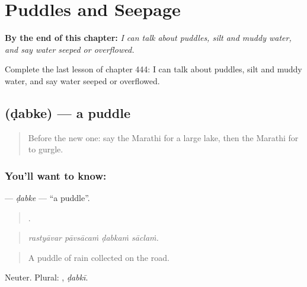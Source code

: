 
\chapter{Puddles and Seepage}
\label{ch:mr-puddles-and-seepage}

\begin{chapteropening}
\textbf{By the end of this chapter:} \emph{I can talk about puddles, silt and muddy water, and say water seeped or overflowed.}

Complete the last lesson of chapter 444: I can talk about puddles, silt and muddy water, and say water seeped or overflowed.
\end{chapteropening}

\section[\texorpdfstring{\mr{डबके} (ḍabke)}{डबके (ḍabke)}]{ (ḍabke) — a puddle}

\label{lesson:MR-C444-dabke}



\begin{quote}
Before the new one: say the Marathi for a large lake, then the Marathi for to gurgle.
\end{quote}

\subsection*{You'll want to know: }
\textbf{} — \emph{ḍabke} — \textquotedblleft{}a puddle\textquotedblright{}.

\begin{quote}
   .
\end{quote}

\begin{quote}
\emph{rastyāvar pāvsācaṁ ḍabkaṁ sāclaṁ.}
\end{quote}

\begin{quote}
A puddle of rain collected on the road.
\end{quote}

Neuter. Plural: , \emph{ḍabkī}.

